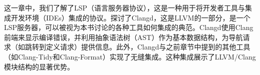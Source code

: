 
这一章中，我们了解了LSP（语言服务器协议），这是一种用于将开发者工具与集成开发环境（IDEs）集成的协议。探讨了Clangd，这是LLVM的一部分，是一个LSP服务器，可以被视为本书讨论的各种工具如何集成的典范。Clangd使用Clang前端来显示编译错误，并利用抽象语法树（AST）作为基本数据结构，为导航请求（如跳转到定义请求）提供信息。此外，Clangd与之前章节中提到的其他工具（如Clang-Tidy和Clang-Format）实现了无缝集成。这种集成展示了LLVM/Clang模块结构的显著优势。
